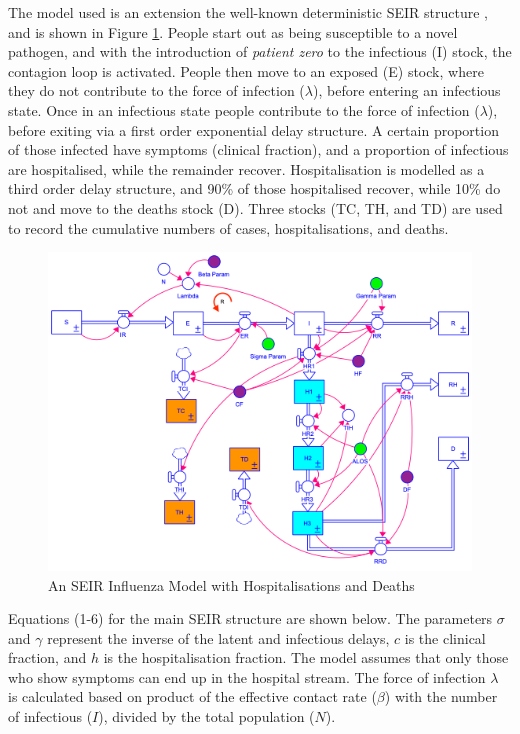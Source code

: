 \documentclass[10pt,letterpaper]{article}
\begin{document}
The model used is an extension the well-known deterministic SEIR structure \citep{vynnycky2010introduction}, and is shown in Figure \ref{fig:mod-seir}. People start out as being susceptible to a novel pathogen, and with the introduction of \emph{patient zero} to the infectious (I) stock, the contagion loop is activated. People then move to an exposed (E) stock, where they do not contribute to the force of infection (\(\lambda\)), before entering an infectious state. Once in an infectious state people contribute to the force of infection (\(\lambda\)), before exiting via a first order exponential delay structure. A certain proportion of those infected have symptoms (clinical fraction), and a proportion of infectious are hospitalised, while the remainder recover. Hospitalisation is modelled as a third order delay structure, and 90\% of those hospitalised recover, while 10\% do not and move to the deaths stock (D). Three stocks (TC, TH, and TD) are used to record the cumulative numbers of cases, hospitalisations, and deaths.

\begin{figure}
\includegraphics[width=0.85\linewidth]{diagrams/SEIR} \caption{An SEIR Influenza Model with Hospitalisations and Deaths}\label{fig:mod-seir}
\end{figure}

Equations (1-6) for the main SEIR structure are shown below. The parameters \(\sigma\) and \(\gamma\) represent the inverse of the latent and infectious delays, \(c\) is the clinical fraction, and \(h\) is the hospitalisation fraction. The model assumes that only those who show symptoms can end up in the hospital stream. The force of infection \(\lambda\) is calculated based on product of the effective contact rate (\(\beta\)) with the number of infectious (\(I\)), divided by the total population (\(N\)).
\end{document}
